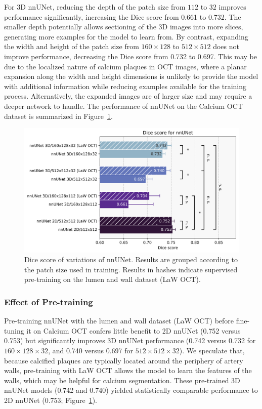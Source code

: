 \documentclass[a4paper,11pt,oneside]{report}
\begin{document}
For 3D nnUNet, reducing the depth of the patch size from $112$ to $32$ improves performance significantly, increasing the Dice score from 0.661 to 0.732. The smaller depth potentially allows sectioning of the 3D images into more slices, generating more examples for the model to learn from. By contrast, expanding the width and height of the patch size from $160\times 128$ to $512\times 512$ does not improve performance, decreasing the Dice score from 0.732 to 0.697. This may be due to the localized nature of calcium plaques in OCT images, where a planar expansion along the width and height dimensions is unlikely to provide the model with additional information while reducing examples available for the training process. Alternatively, the expanded images are of larger size and may require a deeper network to handle. The performance of nnUNet on the Calcium OCT dataset is summarized in Figure~\ref{fig:nnunet-results}.

\begin{figure}[h]
    \centering
    \includegraphics[width=0.8\linewidth]{figures/result_nnunet_results.png}
    \caption{Dice score of variations of nnUNet. Results are grouped according to the patch size used in training. Results in hashes indicate supervised pre-training on the lumen and wall dataset (LaW OCT). 
    }
    \label{fig:nnunet-results}
\end{figure}

\subsubsection{Effect of Pre-training}
Pre-training nnUNet with the lumen and wall dataset (LaW OCT) before fine-tuning it on Calcium OCT confers little benefit to 2D nnUNet (0.752 versus 0.753) but significantly improves 3D nnUNet performance (0.742 versus 0.732 for $160\times 128\times 32$, and 0.740 versus 0.697 for $512\times 512\times 32$). We speculate that, because calcified plaques are typically located around the periphery of artery walls, pre-training with LaW OCT allows the model to learn the features of the walls, which may be helpful for calcium segmentation. These pre-trained 3D nnUNet models (0.742 and 0.740) yielded statistically comparable performance to 2D nnUNet (0.753; Figure~\ref{fig:nnunet-results}). 
\end{document}
